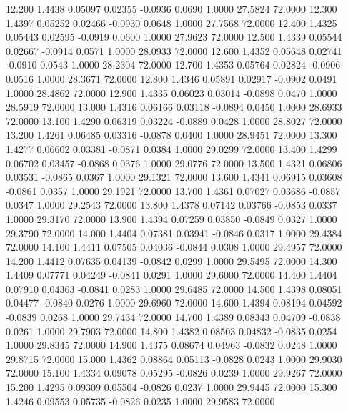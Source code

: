   12.200   1.4438   0.05097   0.02355  -0.0936   0.0690   1.0000  27.5824  72.0000
  12.300   1.4397   0.05252   0.02466  -0.0930   0.0648   1.0000  27.7568  72.0000
  12.400   1.4325   0.05443   0.02595  -0.0919   0.0600   1.0000  27.9623  72.0000
  12.500   1.4339   0.05544   0.02667  -0.0914   0.0571   1.0000  28.0933  72.0000
  12.600   1.4352   0.05648   0.02741  -0.0910   0.0543   1.0000  28.2304  72.0000
  12.700   1.4353   0.05764   0.02824  -0.0906   0.0516   1.0000  28.3671  72.0000
  12.800   1.4346   0.05891   0.02917  -0.0902   0.0491   1.0000  28.4862  72.0000
  12.900   1.4335   0.06023   0.03014  -0.0898   0.0470   1.0000  28.5919  72.0000
  13.000   1.4316   0.06166   0.03118  -0.0894   0.0450   1.0000  28.6933  72.0000
  13.100   1.4290   0.06319   0.03224  -0.0889   0.0428   1.0000  28.8027  72.0000
  13.200   1.4261   0.06485   0.03316  -0.0878   0.0400   1.0000  28.9451  72.0000
  13.300   1.4277   0.06602   0.03381  -0.0871   0.0384   1.0000  29.0299  72.0000
  13.400   1.4299   0.06702   0.03457  -0.0868   0.0376   1.0000  29.0776  72.0000
  13.500   1.4321   0.06806   0.03531  -0.0865   0.0367   1.0000  29.1321  72.0000
  13.600   1.4341   0.06915   0.03608  -0.0861   0.0357   1.0000  29.1921  72.0000
  13.700   1.4361   0.07027   0.03686  -0.0857   0.0347   1.0000  29.2543  72.0000
  13.800   1.4378   0.07142   0.03766  -0.0853   0.0337   1.0000  29.3170  72.0000
  13.900   1.4394   0.07259   0.03850  -0.0849   0.0327   1.0000  29.3790  72.0000
  14.000   1.4404   0.07381   0.03941  -0.0846   0.0317   1.0000  29.4384  72.0000
  14.100   1.4411   0.07505   0.04036  -0.0844   0.0308   1.0000  29.4957  72.0000
  14.200   1.4412   0.07635   0.04139  -0.0842   0.0299   1.0000  29.5495  72.0000
  14.300   1.4409   0.07771   0.04249  -0.0841   0.0291   1.0000  29.6000  72.0000
  14.400   1.4404   0.07910   0.04363  -0.0841   0.0283   1.0000  29.6485  72.0000
  14.500   1.4398   0.08051   0.04477  -0.0840   0.0276   1.0000  29.6960  72.0000
  14.600   1.4394   0.08194   0.04592  -0.0839   0.0268   1.0000  29.7434  72.0000
  14.700   1.4389   0.08343   0.04709  -0.0838   0.0261   1.0000  29.7903  72.0000
  14.800   1.4382   0.08503   0.04832  -0.0835   0.0254   1.0000  29.8345  72.0000
  14.900   1.4375   0.08674   0.04963  -0.0832   0.0248   1.0000  29.8715  72.0000
  15.000   1.4362   0.08864   0.05113  -0.0828   0.0243   1.0000  29.9030  72.0000
  15.100   1.4334   0.09078   0.05295  -0.0826   0.0239   1.0000  29.9267  72.0000
  15.200   1.4295   0.09309   0.05504  -0.0826   0.0237   1.0000  29.9445  72.0000
  15.300   1.4246   0.09553   0.05735  -0.0826   0.0235   1.0000  29.9583  72.0000
